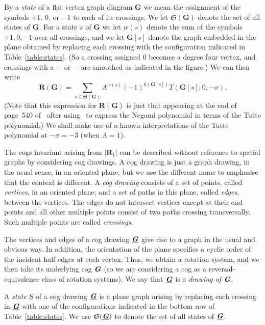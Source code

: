 \documentclass{amsart}
\newcommand{\dr}[1]{\underline{#1}}
\newcommand{\cog}[1]{\textbf{\textit #1}}
\newcommand{\spa}[1]{\mathbf{#1}}
\theoremstyle{definition}
\theoremstyle{remark}
\numberwithin{equation}{section}
\begin{document}
By a \emph{state} of a flat vertex graph diagram $\spa{G}$ we mean the assignment of the symbols $+1$, $0$, or $-1$ to each of its crossings. We let $\mathfrak{S}(\spa{G})$ denote the set of all states of $\spa{G}$. For a state $s$ of $\spa{G}$ we let $w(s)$ denote the sum of the symbols $+1,0,-1$ over all crossings, and we let $\spa{G}[s]$ denote the graph embedded in the plane obtained by replacing each crossing with the configuration indicated in Table~\ref{table:states}. (So a crossing assigned 0 becomes a degree four vertex, and crossings with a $+$ or $-$ are smoothed as indicated in the figure.) We can then write
\begin{equation}\label{eq:yamtutte}
\spa{R}(\spa{G}) = \sum_{s\in \mathfrak{S}(\spa{G})} A^{w(s)} (-1)^{k(\spa{G}[s])} T(\spa{G}[s]; 0, -\sigma).
\end{equation}
(Note that this expression for $\spa{R}(\spa{G})$ is just that appearing at the end of page~540 of~\cite{yamada89} after using~\cite[Theorem~2]{oxley} to express the Negami polynomial in terms of the Tutte polynomial.)
We shall make use of a known interpretations of the Tutte polynomial at $-\sigma=-3$ (when $A=1$).


\medskip

The cogs invariant arising from $|\spa{R}_{1}|$ can be described without reference to spatial graphs by considering cog drawings. 
A cog drawing is just a graph drawing, in the usual sense, in an oriented plane, but we use the different name to emphasise that the context is different.
A \emph{cog drawing} consists of a set of points, called \emph{vertices}, in an oriented plane; and a set of paths in this plane, called \emph{edges}, between the vertices. The edges do not intersect vertices except at their end points and all other multiple points consist of two paths crossing transversally. Such multiple points are called \emph{crossings}. 

The vertices and edges of a cog drawing $\dr{\cog{G}}$ give rise to a graph in the usual and obvious way. In addition, the orientation of the plane specifies a cyclic order of the incident half-edges at each vertex.
Thus, we obtain a rotation system, and we then take its underlying cog $\cog{G}$ (so we are considering a cog as a reversal-equivalence class of rotation systems).
We say that $\dr{\cog{G}}$ is a \emph{drawing of $\cog{G}$}. 

A \emph{state} $\dr{S}$ of a cog drawing $\dr{\cog{G}}$ is a plane graph arising by replacing each crossing in $\dr{\cog{G}}$ with one of the configurations indicated in the bottom row of Table~\ref{table:states}. We use $\mathfrak{S}( \dr{\cog{G}})$ to denote the set of all states of $\dr{\cog{G}}$. 
\end{document}
